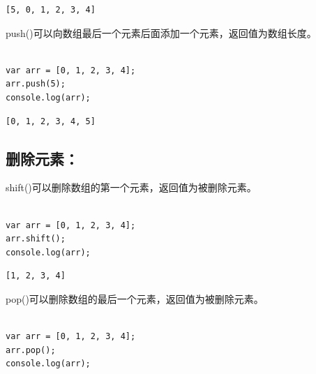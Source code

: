 \begin{tcolorbox}
	\begin{verbatim}
[5, 0, 1, 2, 3, 4]
	\end{verbatim}
\end{tcolorbox}

push()可以向数组最后一个元素后面添加一个元素，返回值为数组长度。\\

\\

\begin{lstlisting}[style=htmlcssjs]
var arr = [0, 1, 2, 3, 4];
arr.push(5);
console.log(arr);
\end{lstlisting}

\begin{tcolorbox}
	\begin{verbatim}
[0, 1, 2, 3, 4, 5]
	\end{verbatim}
\end{tcolorbox}

\vspace{0.5cm}

\subsection{删除元素：}

shift()可以删除数组的第一个元素，返回值为被删除元素。\\

\\

\begin{lstlisting}[style=htmlcssjs]
var arr = [0, 1, 2, 3, 4];
arr.shift();
console.log(arr);
\end{lstlisting}

\begin{tcolorbox}
	\begin{verbatim}
[1, 2, 3, 4]
	\end{verbatim}
\end{tcolorbox}

pop()可以删除数组的最后一个元素，返回值为被删除元素。\\

\\

\begin{lstlisting}[style=htmlcssjs]
var arr = [0, 1, 2, 3, 4];
arr.pop();
console.log(arr);
\end{lstlisting}

